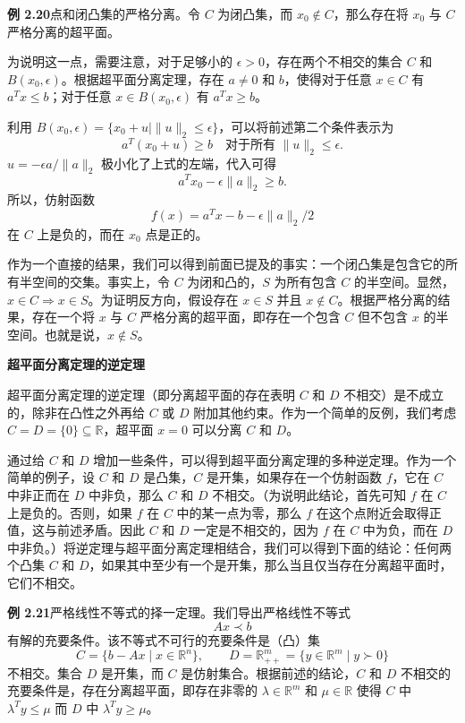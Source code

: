 \documentclass[UTF8,12pt,a4paper,fontset=fandol]{ctexart}
\begin{document}
\noindent\textbf{例 2.20}\quad 点和闭凸集的严格分离。令 $C$ 为闭凸集，而 $x_0\notin C$，那么存在将 $x_0$ 与 $C$ 严格分离的超平面。

为说明这一点，需要注意，对于足够小的 $\epsilon>0$，存在两个不相交的集合 $C$ 和 $B(x_0,\epsilon)$。根据超平面分离定理，存在 $a\ne0$ 和 $b$，使得对于任意 $x\in C$ 有 $a^Tx\le b$；对于任意 $x\in B(x_0,\epsilon)$ 有 $a^Tx\ge b$。

利用 $B(x_0,\epsilon)=\{x_0+u\mid \|u\|_2\le\epsilon\}$，可以将前述第二个条件表示为
\[
  a^T(x_0+u)\ge b\quad \text{对于所有 }\|u\|_2\le\epsilon.
\]
$u=-\epsilon a/\|a\|_2$ 极小化了上式的左端，代入可得
\[
  a^Tx_0-\epsilon\|a\|_2\ge b.
\]
所以，仿射函数
\[
  f(x)=a^Tx-b-\epsilon\|a\|_2/2
\]
在 $C$ 上是负的，而在 $x_0$ 点是正的。

作为一个直接的结果，我们可以得到前面已提及的事实：一个闭凸集是包含它的所有半空间的交集。事实上，令 $C$ 为闭和凸的，$S$ 为所有包含 $C$ 的半空间。显然，$x\in C\Rightarrow x\in S$。为证明反方向，假设存在 $x\in S$ 并且 $x\notin C$。根据严格分离的结果，存在一个将 $x$ 与 $C$ 严格分离的超平面，即存在一个包含 $C$ 但不包含 $x$ 的半空间。也就是说，$x\notin S$。

\noindent\textbf{超平面分离定理的逆定理}

超平面分离定理的逆定理（即分离超平面的存在表明 $C$ 和 $D$ 不相交）是不成立的，除非在凸性之外再给 $C$ 或 $D$ 附加其他约束。作为一个简单的反例，我们考虑 $C=D=\{0\}\subseteq\mathbb{R}$，超平面 $x=0$ 可以分离 $C$ 和 $D$。

通过给 $C$ 和 $D$ 增加一些条件，可以得到超平面分离定理的多种逆定理。作为一个简单的例子，设 $C$ 和 $D$ 是凸集，$C$ 是开集，如果存在一个仿射函数 $f$，它在 $C$ 中非正而在 $D$ 中非负，那么 $C$ 和 $D$ 不相交。（为说明此结论，首先可知 $f$ 在 $C$ 上是负的。否则，如果 $f$ 在 $C$ 中的某一点为零，那么 $f$ 在这个点附近会取得正值，这与前述矛盾。因此 $C$ 和 $D$ 一定是不相交的，因为 $f$ 在 $C$ 中为负，而在 $D$ 中非负。）将逆定理与超平面分离定理相结合，我们可以得到下面的结论：任何两个凸集 $C$ 和 $D$，如果其中至少有一个是开集，那么当且仅当存在分离超平面时，它们不相交。

\noindent\textbf{例 2.21}\quad 严格线性不等式的择一定理。我们导出严格线性不等式
\begin{equation}
  Ax\prec b
  \tag{2.17}
\end{equation}
有解的充要条件。该不等式不可行的充要条件是（凸）集
\[
  C=\{b-Ax\mid x\in\mathbb{R}^n\},\qquad
  D=\mathbb{R}_{++}^m=\{y\in\mathbb{R}^m\mid y\succ0\}
\]
不相交。集合 $D$ 是开集，而 $C$ 是仿射集合。根据前述的结论，$C$ 和 $D$ 不相交的充要条件是，存在分离超平面，即存在非零的 $\lambda\in\mathbb{R}^m$ 和 $\mu\in\mathbb{R}$ 使得 $C$ 中 $\lambda^Ty\le\mu$ 而 $D$ 中 $\lambda^Ty\ge\mu$。
\end{document}
